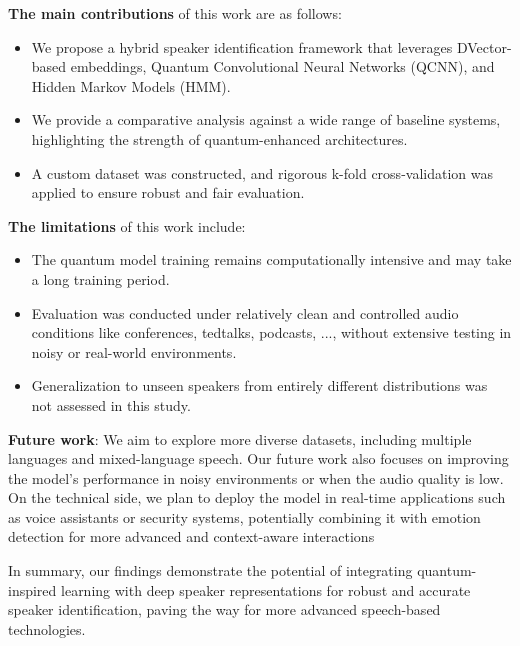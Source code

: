 \documentclass[conference]{IEEEtran}
\begin{document}
\textbf{The main contributions} of this work are as follows:
\begin{itemize}
    \item We propose a hybrid speaker identification framework that leverages DVector-based embeddings, Quantum Convolutional Neural Networks (QCNN), and Hidden Markov Models (HMM).
    \item We provide a comparative analysis against a wide range of baseline systems, highlighting the strength of quantum-enhanced architectures.
    \item A custom dataset was constructed, and rigorous k-fold cross-validation was applied to ensure robust and fair evaluation.
\end{itemize}

\textbf{The limitations} of this work include:
\begin{itemize}
    \item The quantum model training remains computationally intensive and may take a long training period.
    \item Evaluation was conducted under relatively clean and controlled audio conditions like conferences, tedtalks, podcasts, ..., without extensive testing in noisy or real-world environments.
    \item Generalization to unseen speakers from entirely different distributions was not assessed in this study.
\end{itemize}

\textbf{Future work}:
We aim to explore more diverse datasets, including multiple languages and mixed-language speech.
Our future work also focuses on improving the model's performance in noisy environments or when
the audio quality is low. On the technical side, we plan to deploy the model in real-time
applications such as voice assistants or security systems, potentially combining it with
emotion detection for more advanced and context-aware interactions

In summary, our findings demonstrate the potential of integrating quantum-inspired learning with deep speaker representations for robust and accurate speaker identification, paving the way for more advanced speech-based technologies.





\end{document}
